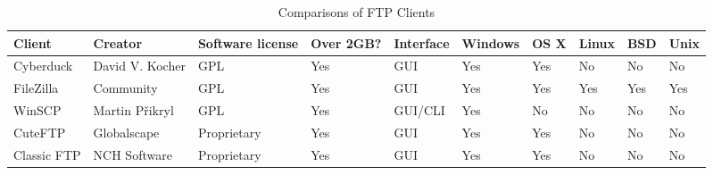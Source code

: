 \documentclass[9pt,twocolumn,twoside]{styles/osajnl}
\begin{document}
\begin{table}[hbt]
\centering

\label{my-label}
\begin{tabular}{|l|l|l|l|l|l|l|l|l|l|}
\hline
\rowcolor[HTML]{D9F4F4} 
\textbf{Client} & \textbf{Creator}         & \textbf{Software license} & \textbf{Over 2GB?} & \textbf{Interface} & \textbf{Windows} & \textbf{OS X} & \textbf{Linux} & \textbf{BSD} & \textbf{Unix} \\ \hline
Cyberduck       & David V. Kocher          & GPL                       & Yes                & GUI                & Yes              & Yes           & No             & No           & No            \\ \hline
FileZilla       & Community                & GPL                       & Yes                & GUI                & Yes              & Yes           & Yes            & Yes          & Yes           \\ \hline
WinSCP          & Martin Přikryl           & GPL                       & Yes                & GUI/CLI            & Yes              & No            & No             & No           & No            \\ \hline
CuteFTP         &Globalscape & Proprietary               & Yes                & GUI                & Yes              & Yes           & No             & No           & No            \\ \hline
Classic FTP     & NCH Software             & Proprietary               & Yes                & GUI                & Yes              & Yes           & No             & No           & No            \\ \hline
\end{tabular}
\caption{Comparisons of FTP Clients \cite{www-wiki-perf}}
\end{table}
\end{document}
